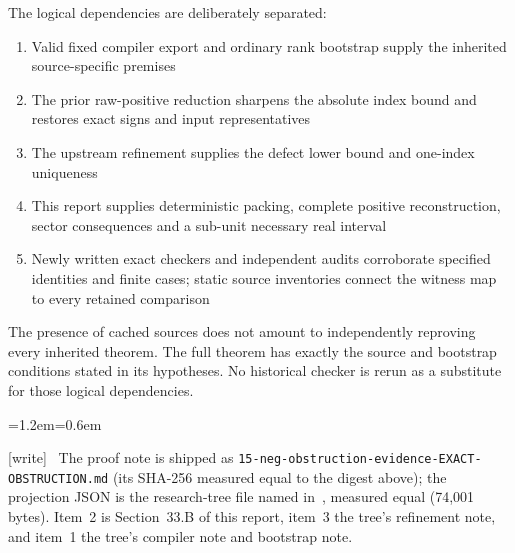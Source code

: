\documentclass[11pt,letterpaper]{article}
\theoremstyle{definition}\newtheorem{definition}[theorem]{Definition}
\theoremstyle{remark}\newtheorem{remark}[theorem]{Remark}
\newcommand{\wtag}{\textup{[write]}}
\newenvironment{writenote}{\par\smallskip\begin{list}{}{\leftmargin=1.2em\rightmargin=0.6em}\item[]\small\wtag\ }{\end{list}\smallskip}
\newcommand{\rw}[1]{\nolinkurl{#1}}%
\begin{document}
The logical dependencies are deliberately separated:
\begin{enumerate}
\item Valid fixed compiler export and ordinary rank bootstrap supply the inherited source-specific premises
\item The prior raw-positive reduction sharpens the absolute index bound and restores exact signs and input representatives
\item The upstream refinement supplies the defect lower bound and one-index uniqueness
\item This report supplies deterministic packing, complete positive reconstruction, sector consequences and a sub-unit necessary real interval
\item Newly written exact checkers and independent audits corroborate specified identities and finite cases; static source inventories connect the witness map to every retained comparison
\end{enumerate}
The presence of cached sources does not amount to independently reproving every inherited theorem. The full theorem has exactly the source and bootstrap conditions stated in its hypotheses. No historical checker is rerun as a substitute for those logical dependencies.
\begin{writenote}
The proof note is shipped as \rw{15-neg-obstruction-evidence-EXACT-OBSTRUCTION.md} (its SHA-256 measured equal to the digest above); the projection JSON is the research-tree file named in~\cite{fup:nz:projection}, measured equal (74,001 bytes). Item~2 is Section~33.B of this report, item~3 the tree's refinement note, and item~1 the tree's compiler note and bootstrap note.
\end{writenote}
\end{document}
